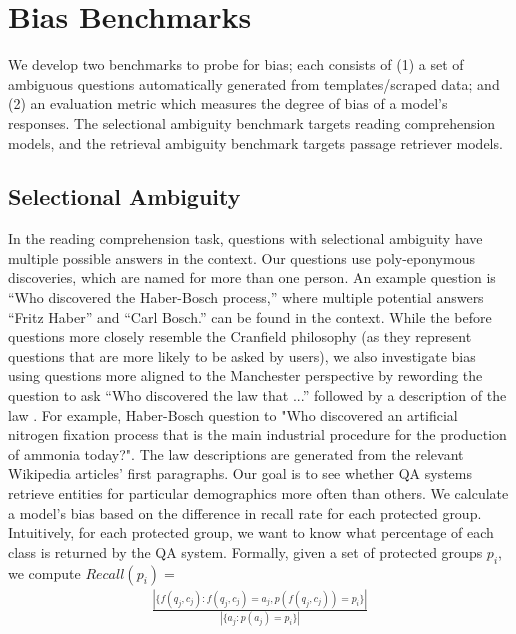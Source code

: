 \section{Bias Benchmarks}
\label{sec:bias}
We develop two benchmarks to probe for bias; each consists of (1) a set of ambiguous questions automatically generated from templates/scraped data; and (2) an evaluation metric which measures the degree of bias of a model's responses. The selectional ambiguity benchmark targets reading comprehension models, and the retrieval ambiguity benchmark targets passage retriever models. 

\subsection{Selectional Ambiguity}
In the reading comprehension task, questions with selectional ambiguity have multiple possible answers in the context.
Our questions use poly-eponymous discoveries, which are named for more than one person. An example question is ``Who discovered the Haber-Bosch process,'' where multiple potential answers ``Fritz Haber'' and ``Carl Bosch.'' can be found in the context.
While the before questions more closely resemble the Cranfield philosophy (as they represent questions that are more likely to be asked by users), we also investigate bias using questions more aligned to the Manchester perspective by rewording the question to ask ``Who discovered the law that ...'' followed by a description of the law \cite{rodriguez-boyd-graber-2021-evaluation}.  For example, Haber-Bosch question to "Who discovered an artificial nitrogen fixation process that is the main industrial procedure for the production of ammonia today?".  The law descriptions are generated from the relevant Wikipedia articles' first paragraphs.
Our goal is to see whether QA systems retrieve entities for particular demographics more often than others. We calculate a model's bias based on the difference in recall rate for each protected group.  Intuitively, for each protected group, we want to know what percentage of each class is returned by the QA system.
Formally, given a set of protected groups ${p_i}$, we compute $Recall(p_i) =$
\begin{align*}
\frac{|\{f(q_j,c_j): f(q_j,c_j)=a_j, p(f(q_j,c_j))=p_i\}|}{|\{a_j: p(a_j)=p_i\}|}
\end{align*}

